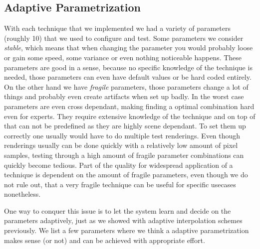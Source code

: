 \subsection{Adaptive Parametrization}

With each technique that we implemented we had a variety of parameters (roughly 10) that we used to configure and test. Some parameters we consider \textit{stable}, which means that when changing the parameter you would probably loose or gain some speed, some variance or even nothing noticeable happens. These parameters are good in a sense, because no specific knowledge of the technique is needed, those parameters can even have default values or be hard coded entirely. On the other hand we have \textit{fragile} parameters, those parameters change a lot of things and probably even create artifacts when set up badly. In the worst case parameters are even cross dependant, making finding a optimal combination hard even for experts. They require extensive knowledge of the technique and on top of that can not be predefined as they are highly scene dependant. To set them up correctly one usually would have to do multiple test renderings. Even though renderings usually can be done quickly with a relatively low amount of pixel samples, testing through a high amount of fragile parameter combinations can quickly become tedious. Part of the quality for widespread application of a technique is dependent on the amount of fragile parameters, even though we do not rule out, that a very fragile technique can be useful for specific usecases nonetheless.

One way to conquer this issue is to let the system learn and decide on the parameters adaptively, just as we showed with adaptive interpolation schemes previously. We list a few parameters where we think a adaptive parametrization makes sense (or not) and can be achieved with appropriate effort.

